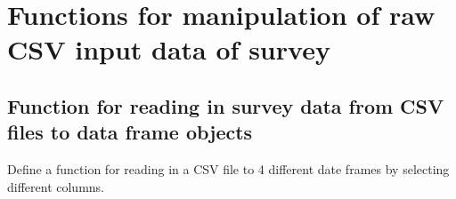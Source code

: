 \documentclass[
]{article}
\begin{document}
\hypertarget{functions-for-manipulation-of-raw-csv-input-data-of-survey}{%
\section{Functions for manipulation of raw CSV input data of
survey}\label{functions-for-manipulation-of-raw-csv-input-data-of-survey}}

\hypertarget{function-for-reading-in-survey-data-from-csv-files-to-data-frame-objects}{%
\subsection{Function for reading in survey data from CSV files to data
frame
objects}\label{function-for-reading-in-survey-data-from-csv-files-to-data-frame-objects}}

Define a function for reading in a CSV file to 4 different date frames
by selecting different columns.
\end{document}
